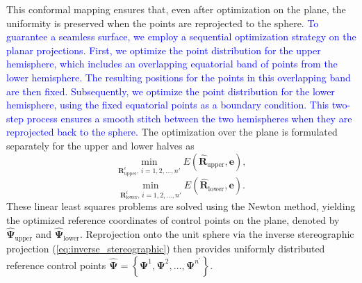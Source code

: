 \documentclass[journal]{IEEEtran}
\theoremstyle{definition}
\begin{document}
This conformal mapping ensures that, even after optimization on the plane, the uniformity is preserved when the points are reprojected to the sphere. \textcolor{blue}{To guarantee a seamless surface, we employ a sequential optimization strategy on the planar projections. First, we optimize the point distribution for the upper hemisphere, which includes an overlapping equatorial band of points from the lower hemisphere. The resulting positions for the points in this overlapping band are then fixed. Subsequently, we optimize the point distribution for the lower hemisphere, using the fixed equatorial points as a boundary condition. This two-step process ensures a smooth stitch between the two hemispheres when they are reprojected back to the sphere.} The optimization over the plane is formulated separately for the upper and lower halves as
\begin{equation}
  \min_{\mathbf{R}^i_\text{upper},\, i=1,2,\dots,n'} E\left(\hat{\mathbf{R}}_\text{upper}, \mathbf{e}\right),
\end{equation}
\begin{equation}
  \min_{\mathbf{R}^i_\text{lower},\, i=1,2,\dots,n'} E\left(\hat{\mathbf{R}}_\text{lower}, \mathbf{e}\right).
\end{equation}
These linear least squares problems are solved using the Newton method, yielding the optimized reference coordinates of control points on the plane, denoted by \(\hat{\mathbf{\Psi}}_\text{upper}\) and \(\hat{\mathbf{\Psi}}_\text{lower}\). Reprojection onto the unit sphere via the inverse stereographic projection (\ref{eq:inverse_stereographic}) then provides uniformly distributed reference control points \(\hat{\mathbf{\Psi}}= \left\{{\mathbf{\Psi}}^1,{\mathbf{\Psi}}^2,\dots,{\mathbf{\Psi}}^{n^\prime}\right\}\).
\end{document}
